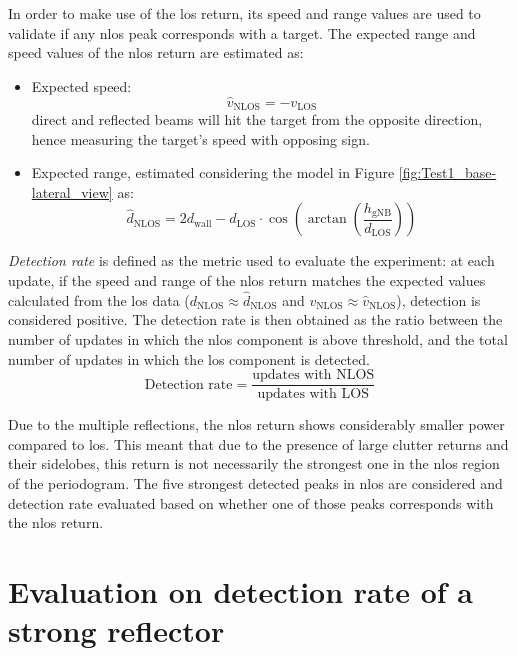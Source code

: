 \newpage
In order to make use of the \gls{los} return, its speed and range values are used to validate if any \gls{nlos} peak corresponds with a target.
The expected range and speed values of the \gls{nlos} return are estimated as:
\begin{itemize}
	\item Expected speed:
	$$ \hat{v}_{\text{NLOS}} = -v_{\text{LOS}}$$
	direct and reflected beams will hit the target from the opposite direction, hence measuring the target's speed with opposing sign.
	\item Expected range, estimated considering the model in Figure \ref{fig:Test1_base-lateral_view} as:
	$$ \hat{d}_{\text{NLOS}} = 2 d_{\text{wall}} - d_{\text{LOS}}\cdot \cos{\left(\arctan{\left(\frac{h_{\text{gNB}}}{d_{\text{LOS}}}\right)}\right)}$$
\end{itemize}

\textit{Detection rate} is defined as the metric used to evaluate the experiment: at each update, if the speed and range of the \gls{nlos} return matches the expected values calculated from the \gls{los} data ($d_{\text{NLOS}} \approx  \hat{d}_{\text{NLOS}}$ and $v_{\text{NLOS}} \approx \hat{v}_{\text{NLOS}}$), detection is considered positive.
The detection rate is then obtained as the ratio between the number of updates in which the \gls{nlos} component is above threshold, and the total number of updates in which the \gls{los} component is detected.
\begin{equation*}
	\text{Detection rate} = \frac{\text{updates with NLOS}}{\text{updates with LOS}}
\end{equation*}

Due to the multiple reflections, the \gls{nlos} return shows considerably smaller power compared to \gls{los}.
This meant that due to the presence of large clutter returns and their sidelobes, this return is not necessarily the strongest one in the \gls{nlos} region of the periodogram.
The five strongest detected peaks in \gls{nlos} are considered and detection rate evaluated based on whether one of those peaks corresponds with the \gls{nlos} return.

\section{Evaluation on detection rate of a strong reflector}

